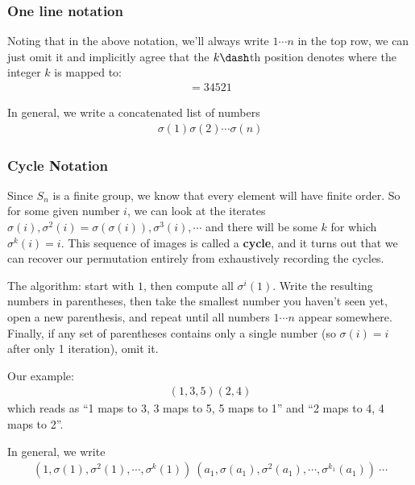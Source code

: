 \hypertarget{one-line-notation}{%
\subsubsection{One line notation}\label{one-line-notation}}

Noting that in the above notation, we'll always write \(1\cdots n\) in
the top row, we can just omit it and implicitly agree that the
\(k\dash\)th position denotes where the integer \(k\) is mapped to:
\begin{align*}
[3,4,5,2,1] = 34521
\end{align*}

In general, we write a concatenated list of numbers
\begin{align*}
\sigma(1)\sigma(2) \cdots \sigma(n)
\end{align*}

\hypertarget{cycle-notation}{%
\subsubsection{Cycle Notation}\label{cycle-notation}}

Since \(S_n\) is a finite group, we know that every element will have
finite order. So for some given number \(i\), we can look at the
iterates
\(\sigma(i), \sigma^2(i) = \sigma(\sigma(i)), \sigma^3(i), \cdots\) and
there will be some \(k\) for which \(\sigma^k(i) = i\). This sequence of
images is called a \textbf{cycle}, and it turns out that we can recover
our permutation entirely from exhaustively recording the cycles.

The algorithm: start with \(1\), then compute all \(\sigma^i(1)\). Write
the resulting numbers in parentheses, then take the smallest number you
haven't seen yet, open a new parenthesis, and repeat until all numbers
\(1 \cdots n\) appear somewhere. Finally, if any set of parentheses
contains only a single number (so \(\sigma(i) = i\) after only 1
iteration), omit it.

Our example:
\begin{align*}
(1,3,5)(2,4)
\end{align*} which reads as ``1 maps to 3, 3 maps to 5, 5 maps to 1''
and ``2 maps to 4, 4 maps to 2''.

In general, we write
\begin{align*}
(1, \sigma(1), \sigma^2(1), \cdots, \sigma^{k}(1))~(a_1, \sigma(a_1), \sigma^2(a_1), \cdots, \sigma^{k_1}(a_1)) ~ \cdots
\end{align*}

